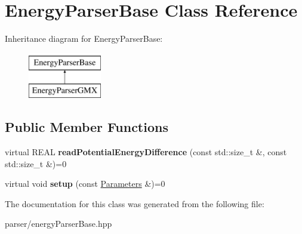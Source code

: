 \hypertarget{classEnergyParserBase}{}\section{Energy\+Parser\+Base Class Reference}
\label{classEnergyParserBase}
Inheritance diagram for Energy\+Parser\+Base\+:\begin{figure}[H]
\begin{center}
\leavevmode
\includegraphics[height=2.000000cm]{classEnergyParserBase}
\end{center}
\end{figure}
\subsection*{Public Member Functions}
\begin{DoxyCompactItemize}
\item 
\mbox{\label{classEnergyParserBase_aa5519bffcf0a4b98248f9a38445ab4a2}} 
virtual R\+E\+AL {\bfseries read\+Potential\+Energy\+Difference} (const std\+::size\+\_\+t \&, const std\+::size\+\_\+t \&)=0
\item 
\mbox{\label{classEnergyParserBase_ae8348bff0f710ce4c1006e215eb1d307}} 
virtual void {\bfseries setup} (const \mbox{\hyperlink{classParameters}{Parameters}} \&)=0
\end{DoxyCompactItemize}


The documentation for this class was generated from the following file\+:\begin{DoxyCompactItemize}
\item 
parser/energy\+Parser\+Base.\+hpp\end{DoxyCompactItemize}
